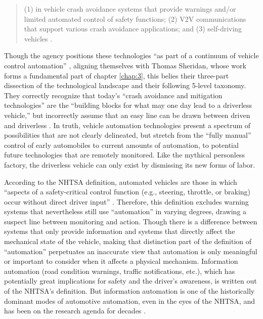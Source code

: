 \begin{quote}
(1) in vehicle crash avoidance systems that provide warnings and/or
limited automated control of safety functions; (2) V2V communications
that support various crash avoidance applications; and (3)
self-driving vehicles \cite[p. 3]{NHTSA}.
\end{quote}

Though the agency positions these technologies ``as part of a
continuum of vehicle control automation'' \cite[p. 3]{NHTSA}, aligning
themselves with Thomas Sheridan, whose
work forms a fundamental part of chapter \ref{chap:3}, this belies
their three-part dissection of the technological landscape and their
following 5-level taxonomy. They correctly recognize that today's
``crash avoidance and mitigation technologies'' are the ``building blocks
for what may one day lead to a driverless vehicle,'' but incorrectly
assume that an easy line can be drawn between driven and
driverless \cite[p. 3]{NHTSA}. In truth, vehicle automation
technologies present a spectrum of possibilities that are not clearly
delineated, but stretch from the ``fully manual'' control of early
automobiles to current amounts of automation, to potential future
technologies that are remotely monitored. Like the mythical personless
factory, the driverless vehicle can only exist by dismissing its new forms
of labor. 

According to the NHTSA definition, automated
vehicles are those in which ``aspects of a safety-critical control
function (e.g., steering, throttle, or braking) occur without direct
driver input'' \cite[p. 3]{NHTSA}. Therefore, this definition excludes warning
systems that nevertheless still use ``automation'' in varying degrees,
drawing a suspect line between monitoring and action. Though there is
a difference between systems that only provide information and systems
that directly affect the mechanical state of the vehicle, making that
distinction part of the definition of ``automation'' perpetuates an
inaccurate view that automation is only meaningful or important to
consider when it affects a physical mechanism. Information automation
(road condition warnings, traffic notifications, etc.), which has
potentially great implications for safety and the driver's awareness,
is written out of the NHTSA's definition. But information automation
is one of the historically dominant modes of automotive automation,
even in the eyes of the NHTSA, and has been on the research agenda for
decades \cite[p. 11]{wetmore}.

